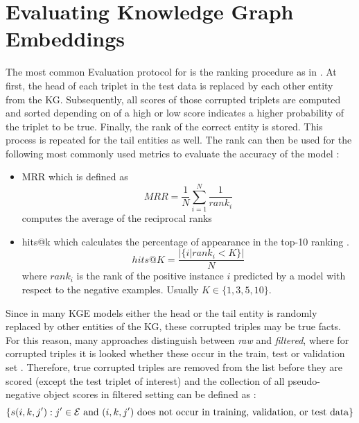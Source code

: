 \section{Evaluating Knowledge Graph Embeddings} 
\label{sec:evaluating_knowledge_graph_embeddings}

The most common Evaluation protocol for is the ranking procedure as in \cite{TransE}.
At first, the head of each triplet in the test data is replaced by each other entity from the \ac{KG}.
Subsequently, all scores of those corrupted triplets are computed and sorted depending on of a high or low score indicates a higher probability of the triplet to be true.
Finally, the rank of the correct entity is stored.
This process is repeated for the tail entities as well.
The rank can then be used for the following most commonly used metrics to evaluate the accuracy of the model \cite{kotnis2017analysis}:
\begin{itemize}
    \item 
    \ac{MRR} which is defined as
    \begin{equation}
        MRR = \frac{1}{N} \sum_{i=1}^{N}\frac{1}{rank_i}
    \end{equation}
    computes the average of the reciprocal ranks \cite{zhang2021efficient}
    
    \item 
    hits@k which calculates the percentage of appearance in the top-10 ranking \cite{zhang2021efficient}.
    \begin{equation}
        hits@K = \frac{|\{i | rank_i < K\}|}{N}
    \end{equation}
    where $rank_i$ is the rank of the positive instance $i$ predicted by a model with respect to the negative examples.
    Usually $K \in \{1, 3, 5, 10\}$.
\end{itemize}
Since in many \ac{KGE} models either the head or the tail entity is randomly replaced by other entities of the KG, these corrupted triples may be true facts.
For this reason, many approaches distinguish between \textit{raw} and \textit{filtered}, where for corrupted triples it is looked whether these occur in the train, test or validation set \cite{TransE}.
Therefore, true corrupted triples are removed from the list before they are scored (except the test triplet of interest) and the collection of all pseudo-negative object scores in filtered setting can be defined as \cite{Ruffinelli2020You}:
$$
\{s(i,k,j'): j' \in \mathcal{E} \text{ and $(i,k,j')$ does not occur in training, validation, or test data}\}
$$
